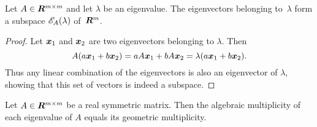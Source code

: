 \begin{lemma}
Let $A \in \bm{R}^{m \times m}$ and let $\lambda$ be an eigenvalue. 
The eigenvectors belonging to~$\lambda$ form a subspace $\mathscr{E}_{A}(\lambda)$ 
of~$\bm{R}^m$.
\end{lemma}
\begin{proof}
Let $\boldsymbol{x}_1$ and $\boldsymbol{x}_2$ are two eigenvectors belonging to $\lambda$.
Then 
\[
    A (a \boldsymbol{x}_1 + b \boldsymbol{x}_2) = 
        a A \boldsymbol{x}_1 + b A \boldsymbol{x}_2 = 
        \lambda (a \boldsymbol{x}_1 + b \boldsymbol{x}_2).
\]
Thus any linear combination of the eigenvectors is also an eigenvector of $\lambda$,
showing that this set of vectors is indeed a subspace. 
\end{proof}

\begin{lemma}
Let $A \in \bm{R}^{m \times m}$ be a real symmetric matrix. Then the algebraic multiplicity 
of each eigenvalue of $A$ equals its geometric multiplicity. 
\end{lemma}
